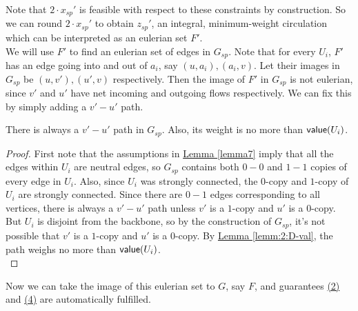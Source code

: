 \documentclass[./main.tex]{subfiles}
\begin{document}
		Note that $2\cdot x_{sp}'$ is feasible with respect to these constraints by construction.
		So we can round $2\cdot x_{sp}'$ to obtain $z_{sp}'$, an integral, minimum-weight circulation which can be interpreted as an eulerian set $F'$.
		\vspace{2mm}\\
		We will use $F'$ to find an eulerian set of edges in $G_{sp}$. Note that for every $U_i$, $F'$ has an edge going into and out of $a_i$, say $(u,a_i),(a_i,v)$. Let their images in $G_{sp}$ be $(u,v'),(u',v)$ respectively. Then the image of $F'$ in $G_{sp}$ is not eulerian, since $v'$ and $u'$ have net incoming and outgoing flows respectively. We can fix this by simply adding a $v'-u'$ path.\\\vspace{2mm}

		\begin{claim}
			There is always a $v'-u'$ path in $G_{sp}$. Also, its weight is no more than $\textsf{\textup{value}}(U_i)$.\label{claim:7:uvpath}
		\end{claim}
		\begin{proof}
			First note that the assumptions in \hyperref[lemma7]{Lemma \ref{lemma7}} imply that all the edges within $U_i$ are neutral edges, so $G_{sp}$ contains both $0-0$ and $1-1$ copies of every edge in $U_i$. Also, since $U_i$ was strongly connected, the $0$-copy and $1$-copy of $U_i$ are strongly connected. Since there are $0-1$ edges corresponding to all vertices, there is always a $v'-u'$ path unless $v'$ is a $1$-copy and $u'$ is a $0$-copy. But $U_i$ is disjoint from the backbone, so by the construction of $G_{sp}$, it's not possible that $v'$ is a $1$-copy and $u'$ is a $0$-copy. By \hyperref[lemm:2:D-val]{Lemma \ref{lemm:2:D-val}}, the path weighs no more than $\textsf{\textup{value}}(U_i)$.\\
		\end{proof}
Now we can take the image of this eulerian set to $G$, say $F$, and guarantees \hyperref[lemm:main:2]{(2)} and \hyperref[lemm:main:4]{(4)} are automatically fulfilled.\vspace{2mm}
\end{document}
